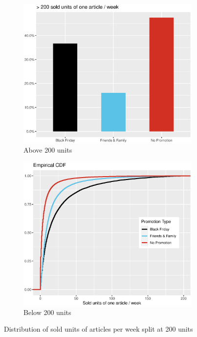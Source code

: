  
 \begin{figure}[H]
\centering
\begin{subfigure}{.45\textwidth}
  \centering
  \includegraphics[width=\linewidth]{figures/bar_above_200_units_week.eps}
  \caption{Above 200 units}
  \label{fig:bar_above_200_units_week}
\end{subfigure}
\begin{subfigure}{.45\textwidth}
  \centering
  \includegraphics[width=\linewidth]{figures/ecdf_below_units_week.eps}
  \caption{Below 200 units}
  \label{fig:ecdf_below_units_week}
\end{subfigure}
\caption{Distribution of sold units of articles per week split at 200 units}
\label{fig:200_split_plots}
\end{figure}


